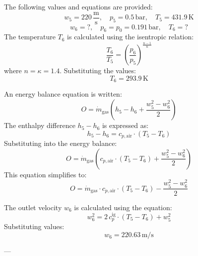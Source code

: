 The following values and equations are provided:  
\[
w_5 = 220 \, \frac{\text{m}}{\text{s}}, \quad p_5 = 0.5 \, \text{bar}, \quad T_5 = 431.9 \, \text{K}
\]  
\[
w_6 = ?, \quad p_6 = p_0 = 0.191 \, \text{bar}, \quad T_6 = ?
\]  
The temperature \( T_6 \) is calculated using the isentropic relation:  
\[
\frac{T_6}{T_5} = \left( \frac{p_6}{p_5} \right)^{\frac{n-1}{n}}
\]  
where \( n = \kappa = 1.4 \). Substituting the values:  
\[
T_6 = 293.9 \, \text{K}
\]  

An energy balance equation is written:  
\[
O = \dot{m}_{\text{gas}} \left( h_5 - h_6 + \frac{w_5^2 - w_6^2}{2} \right)
\]  
The enthalpy difference \( h_5 - h_6 \) is expressed as:  
\[
h_5 - h_6 = c_{p,\text{air}} \cdot \left( T_5 - T_6 \right)
\]  
Substituting into the energy balance:  
\[
O = \dot{m}_{\text{gas}} \left( c_{p,\text{air}} \cdot \left( T_5 - T_6 \right) + \frac{w_5^2 - w_6^2}{2} \right)
\]  
This equation simplifies to:  
\[
O = \dot{m}_{\text{gas}} \cdot c_{p,\text{air}} \cdot \left( T_5 - T_6 \right) - \frac{w_5^2 - w_6^2}{2}
\]

The outlet velocity \( w_6 \) is calculated using the equation:  
\[
w_6^2 = 2 \, c_p^{\text{ig}} \cdot (T_5 - T_6) + w_5^2
\]  
Substituting values:  
\[
w_6 = 220.63 \, \text{m/s}
\]  

---